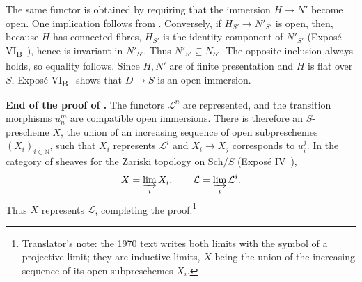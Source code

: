 The same functor is obtained by requiring that the immersion
\(H\to N'\) become open. One implication follows from
. Conversely, if \(H_{S'}\to N'_{S'}\) is open, then,
because \(H\) has connected fibres, \(H_{S'}\) is the identity
component of \(N'_{S'}\) (Exposé VI\textsubscript{B}~), hence is
invariant in \(N'_{S'}\). Thus \(N'_{S'}\subseteq N_{S'}\). The
opposite inclusion always holds, so equality follows. Since \(H,N'\)
are of finite presentation and \(H\) is flat over \(S\), Exposé
VI\textsubscript{B}~ shows that \(D\to S\) is an open immersion.

\medskip\noindent\textbf{End of the proof of .}
The functors \(\mathcal L^n\) are represented, and the transition
morphisms \(u_n^m\) are compatible open immersions. There is therefore
an \(S\)-prescheme \(X\), the union of an increasing sequence of open
subpreschemes \((X_i)_{i\in\mathbb N}\), such that \(X_i\) represents
\(\mathcal L^i\) and \(X_i\to X_j\) corresponds to \(u_i^j\). In the
category of sheaves for the Zariski topology on \(\mathrm{Sch}/S\) (Exposé IV~),
\[
  X=\varinjlim_iX_i,\qquad
  \mathcal L=\varinjlim_i\mathcal L^i.
\]
Thus \(X\) represents \(\mathcal L\), completing the proof.\footnote{Translator's note: the 1970 text writes both limits with the symbol of a projective limit; they are inductive limits, \(X\) being the union of the increasing sequence of its open subpreschemes \(X_i\).}



